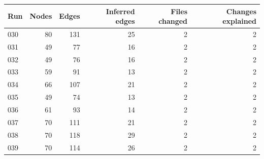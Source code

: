\begin{tabular}{@{}lrrrrr@{}}
\toprule
Run & Nodes & Edges & Inferred edges & Files changed & Changes explained \\
\midrule
030 & 80 & 131 & 25 & 2 & 2 \\
031 & 49 & 77 & 16 & 2 & 2 \\
032 & 49 & 76 & 16 & 2 & 2 \\
033 & 59 & 91 & 13 & 2 & 2 \\
034 & 66 & 107 & 21 & 2 & 2 \\
035 & 49 & 74 & 13 & 2 & 2 \\
036 & 61 & 93 & 14 & 2 & 2 \\
037 & 70 & 111 & 21 & 2 & 2 \\
038 & 70 & 118 & 29 & 2 & 2 \\
039 & 70 & 114 & 26 & 2 & 2 \\
\bottomrule
\end{tabular}
